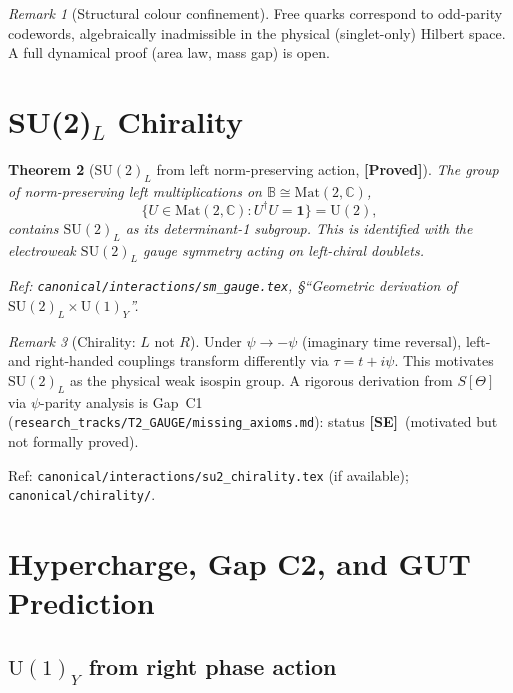 \documentclass[12pt,a4paper]{article}
\newtheorem{theorem}{Theorem}[section]
\theoremstyle{definition}
\theoremstyle{remark}
\newtheorem{remark}[theorem]{Remark}
\newcommand{\PROVED}{\textbf{[Proved]}}
\newcommand{\SE}{\textbf{[SE]}}
\newcommand{\SU}[1]{\mathrm{SU}(#1)}
\newcommand{\UU}[1]{\mathrm{U}(#1)}
\begin{document}
\begin{remark}[Structural colour confinement]
Free quarks correspond to odd-parity codewords, algebraically inadmissible
in the physical (singlet-only) Hilbert space.
A full dynamical proof (area law, mass gap) is open.
\end{remark}

\section{SU(2)$_L$ Chirality}
\label{sec:su2}

\begin{theorem}[$\SU{2}_L$ from left norm-preserving action, \PROVED]
\label{thm:su2}
The group of norm-preserving left multiplications on
$\mathbb{B}\cong\mathrm{Mat}(2,\mathbb{C})$,
\[
  \{U\in\mathrm{Mat}(2,\mathbb{C}) : U^\dagger U = \mathbf{1}\} = \UU{2},
\]
contains $\SU{2}_L$ as its determinant-1 subgroup.
This is identified with the electroweak $\SU{2}_L$ gauge symmetry acting
on left-chiral doublets.

Ref: \texttt{canonical/interactions/sm\_gauge.tex},
\S ``Geometric derivation of $\SU{2}_L\times\UU{1}_Y$''.
\end{theorem}

\begin{remark}[Chirality: $L$ not $R$]
Under $\psi\to-\psi$ (imaginary time reversal), left- and right-handed
couplings transform differently via $\tau = t + i\psi$.
This motivates $\SU{2}_L$ as the physical weak isospin group.
A rigorous derivation from $S[\Theta]$ via $\psi$-parity analysis is
Gap~C1 (\texttt{research\_tracks/T2\_GAUGE/missing\_axioms.md}):
status \SE\ (motivated but not formally proved).

Ref: \texttt{canonical/interactions/su2\_chirality.tex} (if available);
\texttt{canonical/chirality/}.
\end{remark}

\section{Hypercharge, Gap C2, and GUT Prediction}
\label{sec:u1}
\label{sec:hypercharge}

\subsection{$\UU{1}_Y$ from right phase action}
\end{document}
